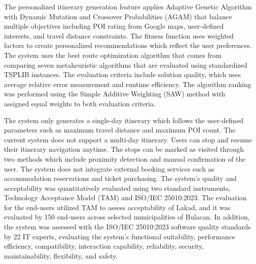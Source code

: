 The personalized itinerary generation feature applies Adaptive Genetic Algorithm with Dynamic Mutation and Crossover Probabilities (AGAM) that balance multiple objectives including POI rating from Google maps, user-defined interests, and travel distance constraints. The fitness function uses weighted factors to create personalized recommendations which reflect the user preferences. The system uses the best route optimization algorithm that comes from comparing seven metaheuristic algorithms that are evaluated using standardized TSPLIB instances. The evaluation criteria include solution quality, which uses average relative error measurement and runtime efficiency. The algorithm ranking was performed using the Simple Additive Weighting (SAW) method with assigned equal weights to both evaluation criteria.

The system only generates a single-day itinerary which follows the user-defined parameters such as maximum travel distance and maximum POI count. The current system does not support a multi-day itinerary. Users can stop and resume their itinerary navigation anytime. The  stops can be marked as visited through two methods which include proximity detection and manual confirmation of the user. The system does not integrate external booking services such as accommodation reservations and ticket purchasing. The system’s quality and acceptability was quantitatively evaluated using two standard instruments, Technology Acceptance Model (TAM) and ISO/IEC 25010:2023. The evaluation for the end-users utilized TAM to assess acceptability of Lakad, and it was evaluated by 150 end-users across selected municipalities of Bulacan. In addition, the system was assessed with the ISO/IEC 25010:2023 software quality standards by 22 IT experts, evaluating the system’s functional suitability, performance efficiency, compatibility, interaction capability, reliability, security, maintainability, flexibility, and safety.

